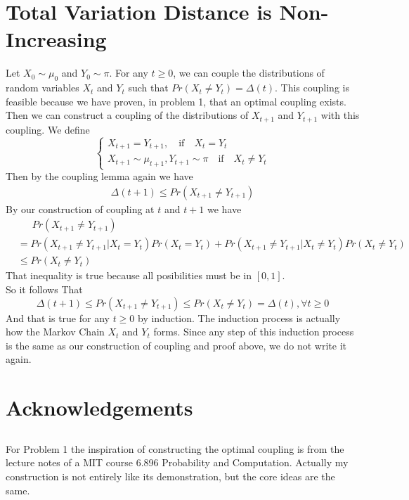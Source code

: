 \documentclass[12pt,letterpaper]{article}
\begin{document}
\section{Total Variation Distance is Non-Increasing}
Let $X_0\sim\mu_0$ and $Y_0\sim\pi$. For any $t\geq 0$, we can couple the distributions of random variables $X_t$ and $Y_t$ such that $Pr(X_t\neq Y_t)=\Delta(t)$. This coupling is feasible because we have proven, in problem 1, that an optimal coupling exists.\\
Then we can construct a coupling of the distributions of  $X_{t+1}$ and $Y_{t+1}$ with this coupling. We define 
$$\begin{cases}
  X_{t+1}=Y_{t+1},\quad \text{if} \quad X_t=Y_t\\
  X_{t+1}\sim\mu_{t+1}, Y_{t+1}\sim\pi \quad \text{if} \quad X_t\neq Y_t
\end{cases}$$
Then by the coupling lemma again we have 
\begin{align}
  \Delta(t+1)\leq Pr(X_{t+1}\neq Y_{t+1})
\end{align}
By our construction of coupling at $t$ and $t+1$ we have
\begin{align}
  &\quad\enspace  Pr(X_{t+1}\neq Y_{t+1})\\
  &=Pr(X_{t+1}\neq Y_{t+1}|X_t=Y_t)Pr(X_t=Y_t)+Pr(X_{t+1}\neq Y_{t+1}|X_t\neq Y_t)Pr(X_t\neq Y_t)\\
  &\leq Pr(X_t\neq Y_t)
\end{align} 
That inequality is true because all posibilities must be in $[0,1]$.\\
So it follows That
$$\Delta(t+1)\leq Pr(X_{t+1}\neq Y_{t+1})\leq Pr(X_t\neq Y_t)=\Delta(t),\forall t\geq 0$$
And that is true for any $t\geq 0$ by induction. The induction process is actually how the Markov Chain $X_t$ and $Y_t$ forms. Since any step of this induction process is the same as our construction of coupling and proof above, we do not write it again.

\newpage
\section{Acknowledgements}
\subsection{}
For Problem 1 the inspiration of constructing the optimal coupling is from the lecture notes of a MIT course 6.896 Probability and Computation.
Actually my construction is not entirely like its demonstration, but the core ideas are the same.\\
\end{document}
